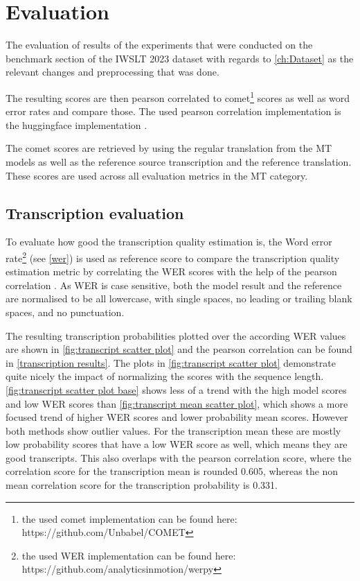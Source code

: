 
\chapter{Evaluation}
\label{ch:Evaluation}
The evaluation of results of the experiments that were conducted on the benchmark section of the IWSLT 2023 dataset \cite{sperber2024evaluating} with regards to \autoref{ch:Dataset} as the relevant changes and preprocessing that was done.

The resulting scores are then pearson correlated \cite{2020SciPy-NMeth} to comet\footnote{the used comet implementation can be found here: https://github.com/Unbabel/COMET} scores as well as word error rates and compare those. The used pearson correlation implementation is the huggingface implementation \cite{huggingfacepearsonr}.

The comet scores are retrieved by using the regular translation from the MT models as well as the reference source transcription and the reference translation. 
These scores are used across all evaluation metrics in the MT category. 

\section{Transcription evaluation}
To evaluate how good the transcription quality estimation is, the Word error rate\footnote{the used WER implementation can be found here: https://github.com/analyticsinmotion/werpy} (see \autoref{wer}) is used as reference score to compare the transcription quality estimation metric by correlating the WER scores with the help of the pearson correlation \cite{2020SciPy-NMeth}.
As WER is case sensitive, both the model result and the reference are normalised to be all lowercase, with single spaces, no leading or trailing blank spaces, and no punctuation.

The resulting transcription probabilities plotted over the according WER values are shown in \autoref{fig:transcript scatter plot} and the pearson correlation can be found in \autoref{transcription results}. 
The plots in \autoref{fig:transcript scatter plot} demonstrate quite nicely the impact of normalizing the scores with the sequence length. \autoref{fig:transcript scatter plot base} shows less of a trend with the high model scores and low WER scores than \autoref{fig:transcript mean scatter plot}, which shows a more focused trend of higher WER scores and lower probability mean scores. 
However both methods show outlier values. For the transcription mean these are mostly low probability scores that have a low WER score as well, which means they are good transcripts. 
This also overlaps with the pearson correlation score, where the correlation score for the transcription mean is rounded 0.605, whereas the non mean correlation score for the transcription probability is 0.331. 


